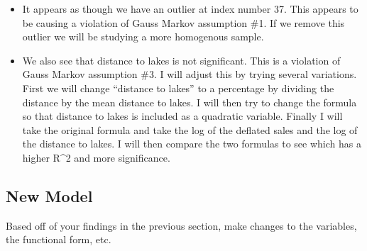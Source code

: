 \documentclass[
]{article}
\newenvironment{Shaded}{\begin{snugshade}}{\end{snugshade}}
\newcommand{\AttributeTok}[1]{\textcolor[rgb]{0.77,0.63,0.00}{#1}}
\newcommand{\DecValTok}[1]{\textcolor[rgb]{0.00,0.00,0.81}{#1}}
\newcommand{\FunctionTok}[1]{\textcolor[rgb]{0.00,0.00,0.00}{#1}}
\newcommand{\NormalTok}[1]{#1}
\newcommand{\OtherTok}[1]{\textcolor[rgb]{0.56,0.35,0.01}{#1}}
\newcommand{\SpecialCharTok}[1]{\textcolor[rgb]{0.00,0.00,0.00}{#1}}
\begin{document}
\begin{itemize}
\item
  It appears as though we have an outlier at index number 37. This
  appears to be causing a violation of Gauss Markov assumption \#1. If
  we remove this outlier we will be studying a more homogenous sample.
\item
  We also see that distance to lakes is not significant. This is a
  violation of Gauss Markov assumption \#3. I will adjust this by trying
  several variations. First we will change ``distance to lakes'' to a
  percentage by dividing the distance by the mean distance to lakes. I
  will then try to change the formula so that distance to lakes is
  included as a quadratic variable. Finally I will take the original
  formula and take the log of the deflated sales and the log of the
  distance to lakes. I will then compare the two formulas to see which
  has a higher R\^{}2 and more significance.
\end{itemize}

\hypertarget{new-model}{%
\subsection{New Model}\label{new-model}}

Based off of your findings in the previous section, make changes to the
variables, the functional form, etc.

\begin{Shaded}
\end{Shaded}
\end{document}
